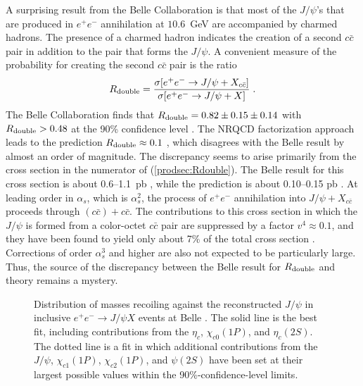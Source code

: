 A surprising result from the Belle Collaboration is that most of the
$J/\psi$'s that are produced in $e^+e^-$ annihilation at $10.6$~GeV are
accompanied by charmed hadrons. The presence of a charmed hadron
indicates the creation of a second $c \bar c$ pair in addition to the
pair that forms the $J/\psi$. A convenient measure of the probability
for creating the second $c \bar c$ pair is the ratio
%
\begin{eqnarray}
R_{\rm double} =
{\sigma[e^+e^-\to J/\psi+X_{c\bar c}] 
        \over \sigma[e^+e^-\to J/\psi+X]} \;. 
\label{prodsec:Rdouble}
\end{eqnarray}
%
The Belle Collaboration finds that $R_{\rm double} =0.82\pm 0.15\pm
0.14$ with $R_{\rm double} > 0.48$ at the 90\% confidence level
\cite{belle-eps2003}. The NRQCD factorization approach leads to the
prediction $R_{\rm double}\approx 0.1$
\cite{Cho:1996cg,Baek:1996kq,Yuan:1996ep}, which disagrees with the
Belle result by almost an order of magnitude. The discrepancy seems to
arise primarily from the cross section in the numerator of
(\ref{prodsec:Rdouble}). The Belle result for this cross section is
about 0.6--1.1~pb \cite{Abe:2002rb}, while the prediction is about
0.10--0.15 pb \cite{Cho:1996cg,Baek:1996kq,Yuan:1996ep,Liu:2003jj}. At
leading order in $\alpha_s$, which is $\alpha_s^2$, the process of
$e^+e^-$ annihilation into $J/\psi+X_{c\bar c}$ proceeds through $(c
\bar c)+c\bar c$. The contributions to this cross section in which the
$J/\psi$ is formed from a color-octet $c\bar c$ pair are suppressed by
a factor $v^4\approx 0.1$, and they have been found to yield only
about 7\% of the total cross section \cite{Liu:2003jj}. Corrections of
order $\alpha_s^3$ and higher are also not expected to be particularly
large. Thus, the source of the discrepancy between the Belle result
for $R_{\rm double}$ and theory remains a mystery.

\begin{figure}[ht]
\begin{center}
\caption{Distribution of masses recoiling against the reconstructed
$J/\psi$ in inclusive $e^+e^- \rightarrow J/\psi X$ events at Belle
\cite{Abe:2004ww}. The solid line is the best fit, including
contributions from the $\eta_c$, $\chi_{c0}(1P)$, and $\eta_c(2S)$.
The dotted line is a fit in which additional contributions from the
$J/\psi$, $\chi_{c1}(1P)$, $\chi_{c2}(1P)$, and $\psi(2S)$ have been set
at their largest possible values within the 90\%-confidence-level
limits.
}
\label{fig-belledoublecharm}
\end{center}
\end{figure}

